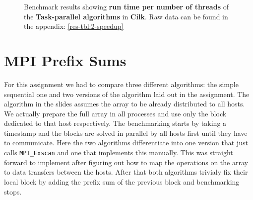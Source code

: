 \begin{figure}[h!]
\centering
{}
\caption{Benchmark results showing \textbf{run time per number of threads} of the \textbf{Task-parallel algorithms} in \textbf{Cilk}. Raw data can be found in the appendix: \autoref{res-tbl:2-speedup}}
\label{plot:2-speedup}
\end{figure}


\section{MPI Prefix Sums}

For this assignment we had to compare three different algorithms: the simple sequential one and two versions of the algorithm laid out in the assignment.
The algorithm in the slides assumes the array to be already distributed to all hosts.
We actually prepare the full array in all processes and use only the block dedicated to that host respectively.
The benchmarking starts by taking a timestamp and the blocks are solved in parallel by all hosts first until they have to communicate.
Here the two algorithms differentiate into one version that just calls \texttt{MPI\_Exscan} and one that implements this manually.
This was straight forward to implement after figuring out how to map the operations on the array to data transfers between the hosts.
After that both algorithms trivialy fix their local block by adding the prefix sum of the previous block and benchmarking stops.

